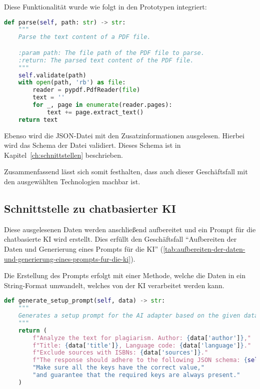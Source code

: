 Diese Funktionalität wurde wie folgt in den Prototypen integriert:
\begin{lstlisting}[caption={Auslesen von PDF-Dateien},captionpos=b,label={lst:pypdf}, language=Python]
def parse(self, path: str) -> str:
    """
    Parse the text content of a PDF file.

    :param path: The file path of the PDF file to parse.
    :return: The parsed text content of the PDF file.
    """
    self.validate(path)
    with open(path, 'rb') as file:
        reader = pypdf.PdfReader(file)
        text = ''
        for _, page in enumerate(reader.pages):
            text += page.extract_text()
    return text
\end{lstlisting}

Ebenso wird die JSON-Datei mit den Zusatzinformationen ausgelesen.
Hierbei wird das Schema der Datei validiert.
Dieses Schema ist in Kapitel~\ref{ch:schnittstellen} beschrieben.

Zusammenfassend lässt sich somit festhalten, dass auch dieser Geschäftsfall mit den ausgewählten Technologien machbar ist.

\subsection{Schnittstelle zu chatbasierter KI}\label{subsec:schnittstelle-zu-chatbasierter-ki}
Diese ausgelesenen Daten werden anschließend aufbereitet und ein Prompt für die chatbasierte KI wird erstellt.
Dies erfüllt den Geschäftsfall ``Aufbereiten der Daten und Generierung eines Prompts für die KI'' (\ref{tab:aufbereiten-der-daten-und-generierung-eines-prompts-fur-die-ki}).

Die Erstellung des Prompts erfolgt mit einer Methode, welche die Daten in ein String-Format umwandelt,
welches von der KI verarbeitet werden kann.
\begin{lstlisting}[caption={Erstellung eines Prompts für die KI},captionpos=b,label={lst:prompt-erstellen}, language=Python]
def generate_setup_prompt(self, data) -> str:
    """
    Generates a setup prompt for the AI adapter based on the given data.
    """
    return (
        f"Analyze the text for plagiarism. Author: {data['author']},"
        f"Title: {data['title']}, Language code: {data['language']}."
        f"Exclude sources with ISBNs: {data['sources']}."
        f"The response should adhere to the following JSON schema: {self.schema}"
        "Make sure all the keys have the correct value,"
        "and guarantee that the required keys are always present."
    )
\end{lstlisting}

